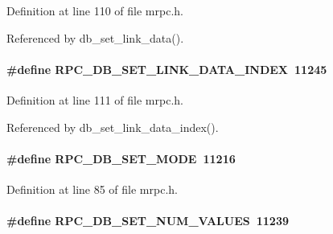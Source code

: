 Definition at line 110 of file mrpc.h.

Referenced by db\_\-set\_\-link\_\-data().
\paragraph[{RPC\_\-DB\_\-SET\_\-LINK\_\-DATA\_\-INDEX}]{\setlength{\rightskip}{0pt plus 5cm}\#define RPC\_\-DB\_\-SET\_\-LINK\_\-DATA\_\-INDEX~11245}\hfill\label{group__mrpcdefineh_ga6a1b58ac9701edc445b4ec1e87defc13}

\begin{DoxyItemize}
\item 
\end{DoxyItemize}

Definition at line 111 of file mrpc.h.

Referenced by db\_\-set\_\-link\_\-data\_\-index().
\paragraph[{RPC\_\-DB\_\-SET\_\-MODE}]{\setlength{\rightskip}{0pt plus 5cm}\#define RPC\_\-DB\_\-SET\_\-MODE~11216}\hfill\label{group__mrpcdefineh_ga784c96e198a61dd19c2a73801093026c}

\begin{DoxyItemize}
\item 
\end{DoxyItemize}

Definition at line 85 of file mrpc.h.
\paragraph[{RPC\_\-DB\_\-SET\_\-NUM\_\-VALUES}]{\setlength{\rightskip}{0pt plus 5cm}\#define RPC\_\-DB\_\-SET\_\-NUM\_\-VALUES~11239}\hfill\label{group__mrpcdefineh_ga2900e0aea433fd79525a7b6fe1d78fc9}

\begin{DoxyItemize}
\item 
\end{DoxyItemize}

